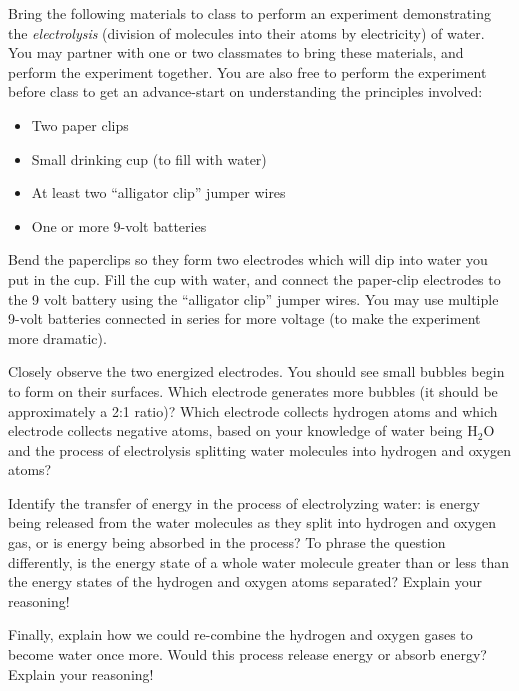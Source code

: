
Bring the following materials to class to perform an experiment demonstrating the {\it electrolysis} (division of molecules into their atoms by electricity) of water.  You may partner with one or two classmates to bring these materials, and perform the experiment together.  You are also free to perform the experiment before class to get an advance-start on understanding the principles involved:

\begin{itemize}
\item{} Two paper clips
\vskip 5pt
\item{} Small drinking cup (to fill with water)
\vskip 5pt
\item{} At least two ``alligator clip'' jumper wires
\vskip 5pt
\item{} One or more 9-volt batteries
\end{itemize}

Bend the paperclips so they form two electrodes which will dip into water you put in the cup.  Fill the cup with water, and connect the paper-clip electrodes to the 9 volt battery using the ``alligator clip'' jumper wires.  You may use multiple 9-volt batteries connected in series for more voltage (to make the experiment more dramatic).

Closely observe the two energized electrodes.  You should see small bubbles begin to form on their surfaces.  Which electrode generates more bubbles (it should be approximately a 2:1 ratio)?  Which electrode collects hydrogen atoms and which electrode collects negative atoms, based on your knowledge of water being H$_{2}$O and the process of electrolysis splitting water molecules into hydrogen and oxygen atoms?

\vskip 10pt

Identify the transfer of energy in the process of electrolyzing water: is energy being released from the water molecules as they split into hydrogen and oxygen gas, or is energy being absorbed in the process?  To phrase the question differently, is the energy state of a whole water molecule greater than or less than the energy states of the hydrogen and oxygen atoms separated?  Explain your reasoning!

\vskip 10pt

Finally, explain how we could re-combine the hydrogen and oxygen gases to become water once more.  Would this process release energy or absorb energy?  Explain your reasoning!

